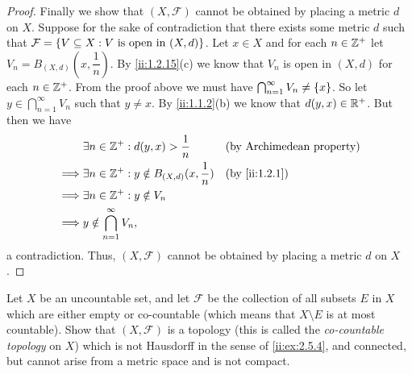 \begin{proof}
  Finally we show that \((X, \mathcal{F})\) cannot be obtained by placing a metric \(d\) on \(X\).
  Suppose for the sake of contradiction that there exists some metric \(d\) such that \(\mathcal{F} = \left\lbrace V \subseteq X : V \text{ is open in } (X, d)\right\rbrace\).
  Let \(x \in X\) and for each \(n \in \mathbb{Z}^+\) let \(V_n = B_{(X, d)}(x, \dfrac{1}{n})\).
  By \cref{ii:1.2.15}(c) we know that \(V_n\) is open in \((X, d)\) for each \(n \in \mathbb{Z}^+\).
  From the proof above we must have \(\bigcap_{n = 1}^\infty V_n \neq \left\lbrace x\right\rbrace\).
  So let \(y \in \bigcap_{n = 1}^\infty V_n\) such that \(y \neq x\).
  By \cref{ii:1.1.2}(b) we know that \(d(y, x) \in \mathbb{R}^+\).
  But then we have
  \begin{align*}
             & \exists n \in \Z^+ : d(y, x) > \dfrac{1}{n}               &  & \text{(by Archimedean property)} \\
    \implies & \exists n \in \Z^+ : y \notin B_{(X, d)}(x, \dfrac{1}{n}) &  & \by{ii:1.2.1}                    \\
    \implies & \exists n \in \Z^+ : y \notin V_n                                                               \\
    \implies & y \notin \bigcap_{n = 1}^\infty V_n,
  \end{align*}
  a contradiction.
  Thus, \((X, \mathcal{F})\) cannot be obtained by placing a metric \(d\) on \(X\).
\end{proof}

\begin{ex}\label{ii:ex:2.5.7}
  Let \(X\) be an uncountable set, and let \(\mathcal{F}\) be the collection of all subsets \(E\) in \(X\) which are either empty or co-countable
  (which means that \(X \setminus E\) is at most countable).
  Show that \((X, \mathcal{F})\) is a topology (this is called the \emph{co-countable topology} on \(X\)) which is not Hausdorff in the sense of \cref{ii:ex:2.5.4}, and connected, but cannot arise from a metric space and is not compact.
\end{ex}

